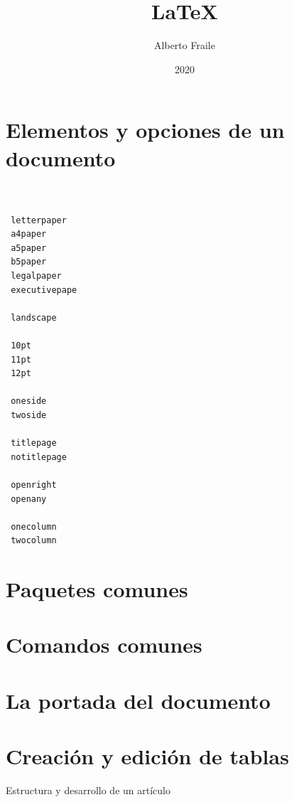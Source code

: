 \documentclass[a4paper, 10.5pt, titlepage]{article}
\title{LaTeX}
\author{Alberto Fraile}
\date{2020}
\begin{document}
\maketitle
\tableofcontents
\newpage

\section{Elementos y opciones de un documento}

 \begin{verbatim}   


 letterpaper
 a4paper
 a5paper
 b5paper
 legalpaper
 executivepape

 landscape

 10pt
 11pt
 12pt

 oneside
 twoside

 titlepage
 notitlepage

 openright
 openany
 
 onecolumn
 twocolumn
\end{verbatim}   

\newpage

\section{Paquetes comunes}

\newpage

\section{Comandos comunes}

\newpage

\section{La portada del documento}

\newpage

\section{Creación y edición de tablas}

\newpage

\begin{section}{Estructura y desarrollo de un artículo}\end{section}
\end{document}
